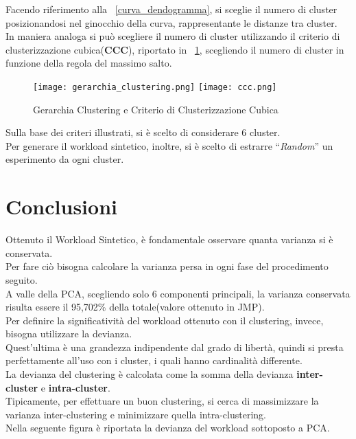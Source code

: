 Facendo riferimento alla \figurename~\ref{curva_dendogramma}, si sceglie il numero
di cluster posizionandosi nel ginocchio della curva, rappresentante le distanze tra cluster.\\
\clearpage
In maniera analoga si può scegliere il numero di cluster utilizzando il criterio
di clusterizzazione cubica(\textbf{CCC}), riportato in \figurename~\ref{ccc},
scegliendo il numero di cluster in funzione della regola del massimo salto.\\

\begin{figure}[htbp]
\centering
\texttt{[image: gerarchia\_clustering.png]}%
\qquad\qquad
\texttt{[image: ccc.png]}
\caption{Gerarchia Clustering e Criterio di Clusterizzazione Cubica}
\label{ccc}
\end{figure}

Sulla base dei criteri illustrati, si è scelto di considerare 6 cluster.\\
Per generare il workload sintetico, inoltre, si è scelto di estrarre ``\textit{Random}''
un esperimento da ogni cluster.\\
\clearpage

\section{Conclusioni}
Ottenuto il Workload Sintetico, è fondamentale osservare quanta varianza si è conservata.\\
Per fare ciò bisogna calcolare la varianza persa in ogni fase del procedimento seguito.\\
A valle della PCA, scegliendo solo 6 componenti principali, la varianza conservata
 risulta essere il 95,702\% della totale(valore ottenuto in JMP).\\
Per definire la significatività del workload ottenuto con il clustering, invece, bisogna
utilizzare la devianza.\\
Quest'ultima è una grandezza indipendente dal grado di libertà, quindi si presta
perfettamente all'uso con i cluster, i quali hanno cardinalità differente.\\

La devianza del clustering è calcolata come la somma della devianza \textbf{inter-cluster}
e \textbf{intra-cluster}.\\
Tipicamente, per effettuare un buon clustering, si cerca di massimizzare la varianza
inter-clustering e minimizzare quella intra-clustering.\\
Nella seguente figura è riportata la devianza del workload sottoposto a PCA.\\

